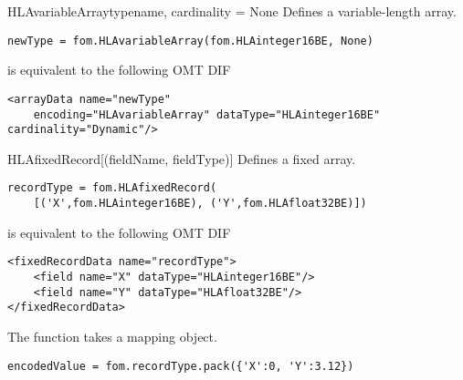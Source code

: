 \begin{classdesc}{HLAvariableArray}{typename, cardinality = None}
Defines a variable-length array.

\begin{verbatim}
newType = fom.HLAvariableArray(fom.HLAinteger16BE, None)
\end{verbatim}
is equivalent to the following OMT DIF
\begin{verbatim}
<arrayData name="newType"
    encoding="HLAvariableArray" dataType="HLAinteger16BE" cardinality="Dynamic"/>
\end{verbatim}
\end{classdesc}

\begin{classdesc}{HLAfixedRecord}{[(fieldName, fieldType)]}
Defines a fixed array.

\begin{verbatim}
recordType = fom.HLAfixedRecord(
    [('X',fom.HLAinteger16BE), ('Y',fom.HLAfloat32BE)])
\end{verbatim}
is equivalent to the following OMT DIF
\begin{verbatim}
<fixedRecordData name="recordType">
    <field name="X" dataType="HLAinteger16BE"/>
    <field name="Y" dataType="HLAfloat32BE"/>
</fixedRecordData>
\end{verbatim}

The  function takes a mapping object.
\begin{verbatim}
encodedValue = fom.recordType.pack({'X':0, 'Y':3.12})
\end{verbatim}
\end{classdesc}

